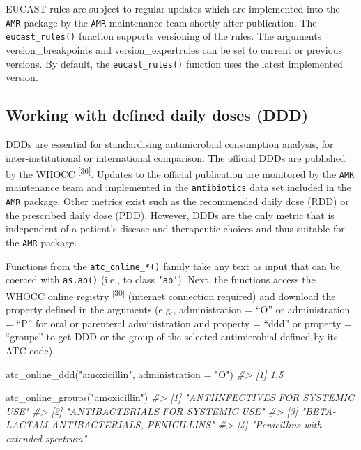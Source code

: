 \documentclass[
]{book}
\newenvironment{Shaded}{\begin{snugshade}}{\end{snugshade}}
\newcommand{\AttributeTok}[1]{\textcolor[rgb]{0.77,0.63,0.00}{#1}}
\newcommand{\CommentTok}[1]{\textcolor[rgb]{0.56,0.35,0.01}{\textit{#1}}}
\newcommand{\FunctionTok}[1]{\textcolor[rgb]{0.00,0.00,0.00}{#1}}
\newcommand{\NormalTok}[1]{#1}
\newcommand{\StringTok}[1]{\textcolor[rgb]{0.31,0.60,0.02}{#1}}
\begin{document}
EUCAST rules are subject to regular updates which are implemented into the \texttt{AMR} package by the \texttt{AMR} maintenance team shortly after publication. The \texttt{eucast\_rules()} function supports versioning of the rules. The arguments version\_breakpoints and version\_expertrules can be set to current or previous versions. By default, the \texttt{eucast\_rules()} function uses the latest implemented version.

\hypertarget{working-with-defined-daily-doses-ddd}{%
\subsection{Working with defined daily doses (DDD)}\label{working-with-defined-daily-doses-ddd}}

DDDs are essential for standardising antimicrobial consumption analysis, for inter-institutional or international comparison. The official DDDs are published by the WHOCC \textsuperscript{{[}36{]}}. Updates to the official publication are monitored by the \texttt{AMR} maintenance team and implemented in the \texttt{antibiotics} data set included in the \texttt{AMR} package. Other metrics exist such as the recommended daily dose (RDD) or the prescribed daily dose (PDD). However, DDDs are the only metric that is independent of a patient's disease and therapeutic choices and thus suitable for the \texttt{AMR} package.

Functions from the \texttt{atc\_online\_*()} family take any text as input that can be coerced with \texttt{as.ab()} (i.e., to class \texttt{‘ab’}). Next, the functions access the WHOCC online registry \textsuperscript{{[}30{]}} (internet connection required) and download the property defined in the arguments (e.g., administration = ``O'' or administration = ``P'' for oral or parenteral administration and property = ``ddd'' or property = ``groups'' to get DDD or the group of the selected antimicrobial defined by its ATC code).

\begin{Shaded}
\begin{Highlighting}[]
\FunctionTok{atc\_online\_ddd}\NormalTok{(}\StringTok{"amoxicillin"}\NormalTok{, }\AttributeTok{administration =} \StringTok{"O"}\NormalTok{)}
\CommentTok{\#\textgreater{} [1] 1.5}

\FunctionTok{atc\_online\_groups}\NormalTok{(}\StringTok{"amoxicillin"}\NormalTok{)}
\CommentTok{\#\textgreater{} [1] "ANTIINFECTIVES FOR SYSTEMIC USE"}
\CommentTok{\#\textgreater{} [2] "ANTIBACTERIALS FOR SYSTEMIC USE"}
\CommentTok{\#\textgreater{} [3] "BETA{-}LACTAM ANTIBACTERIALS, PENICILLINS"}
\CommentTok{\#\textgreater{} [4] "Penicillins with extended spectrum"}
\end{Highlighting}
\end{Shaded}
\end{document}
